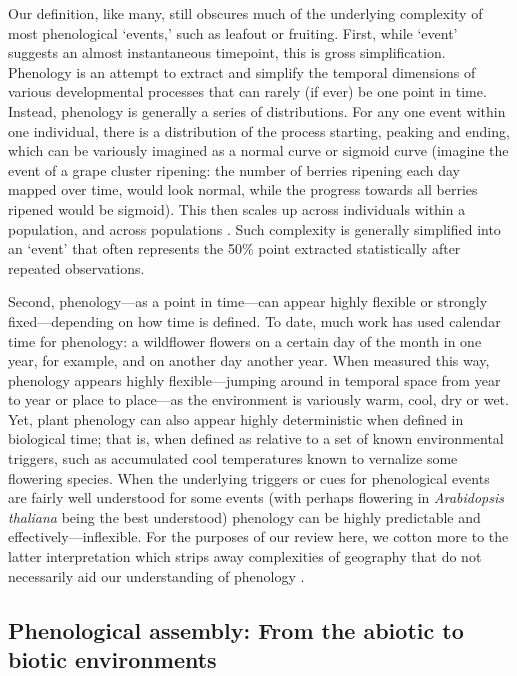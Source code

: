 \documentclass[11pt]{article}
\begin{document}
Our definition, like many, still obscures much of the underlying complexity of most phenological `events,' such as leafout or fruiting. First, while `event' suggests an almost instantaneous timepoint, this is gross simplification. Phenology is an attempt to extract and simplify the temporal dimensions of various developmental processes that can rarely (if ever) be one point in time. Instead, phenology is generally a series of distributions. For any one event within one individual, there is a distribution of the process starting, peaking and ending, which can be variously imagined as a normal curve or sigmoid curve (imagine the event of a grape cluster ripening: the number of berries ripening each day mapped over time, would look normal, while the progress towards all berries ripened would be sigmoid). This then scales up across individuals within a population, and across populations \citep{inouye2019}. Such complexity is generally simplified into an `event' that often represents the 50\% point extracted statistically after repeated observations. 

Second, phenology---as a point in time---can appear highly flexible or strongly fixed---depending on how time is defined. To date, much work has used calendar time for phenology: a wildflower flowers on a certain day of the month in one year, for example, and on another day another year. When measured this way, phenology appears highly flexible---jumping around in temporal space from year to year or place to place---as the environment is variously warm, cool, dry or wet. Yet, plant phenology can also appear highly deterministic when defined in biological time; that is, when defined as relative to a set of known environmental triggers, such as accumulated cool temperatures known to vernalize some flowering species. When the underlying triggers or cues for phenological events are fairly well understood for some events (with perhaps flowering in \emph{Arabidopsis thaliana} being the best understood) phenology can be highly predictable and effectively---inflexible. For the purposes of our review here, we cotton more to the latter interpretation which strips away complexities of geography that do not necessarily aid our understanding of phenology \citep{davies2013}. 

\subsection*{Phenological assembly: From the abiotic to biotic environments} %
\end{document}
